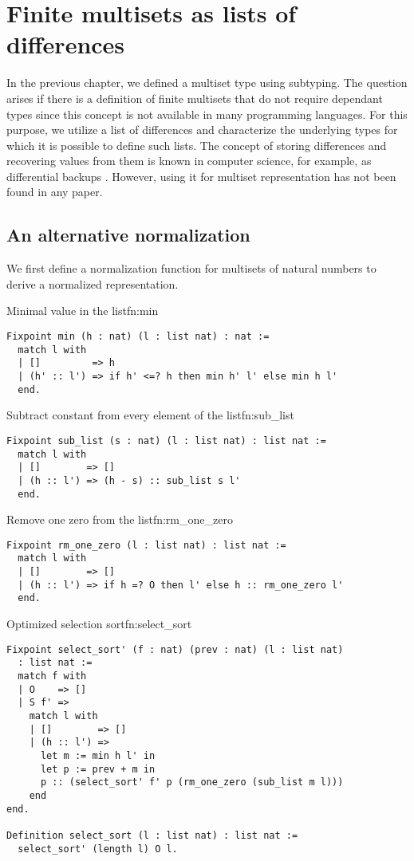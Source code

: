 \section{Finite multisets as lists of differences}
In the previous chapter, we defined a multiset type using subtyping. The question arises if there is a definition of finite multisets that do not require dependant types since this concept is not available in many programming languages. For this purpose, we utilize a list of differences and characterize the underlying types for which it is possible to define such lists. The concept of storing differences and recovering values from them is known in computer science, for example, as differential backups \cite{DiffBackups}. However, using it for multiset representation has not been found in any paper.
\subsection{An alternative normalization}
We first define a normalization function for multisets of natural numbers to derive a normalized representation.
\begin{func}{Minimal value in the list}{fn:min}
\begin{verbatim}
Fixpoint min (h : nat) (l : list nat) : nat :=
  match l with
  | []         => h
  | (h' :: l') => if h' <=? h then min h' l' else min h l'
  end.
\end{verbatim}
\end{func}
\begin{func}{Subtract constant from every element of the list}{fn:sub_list}
\begin{verbatim}
Fixpoint sub_list (s : nat) (l : list nat) : list nat :=
  match l with
  | []        => []
  | (h :: l') => (h - s) :: sub_list s l'
  end.
\end{verbatim}
\end{func}
\begin{func}{Remove one zero from the list}{fn:rm_one_zero}
\begin{verbatim}
Fixpoint rm_one_zero (l : list nat) : list nat :=
  match l with
  | []        => []
  | (h :: l') => if h =? O then l' else h :: rm_one_zero l'
  end.
\end{verbatim}
\end{func}
\begin{func}[D]{Optimized selection sort}{fn:select_sort}
\begin{verbatim}
Fixpoint select_sort' (f : nat) (prev : nat) (l : list nat) 
  : list nat :=
  match f with
  | O    => []
  | S f' =>
    match l with
    | []        => []
    | (h :: l') => 
      let m := min h l' in
      let p := prev + m in
      p :: (select_sort' f' p (rm_one_zero (sub_list m l)))
    end
end.

Definition select_sort (l : list nat) : list nat :=
  select_sort' (length l) O l.
\end{verbatim}
\end{func}
